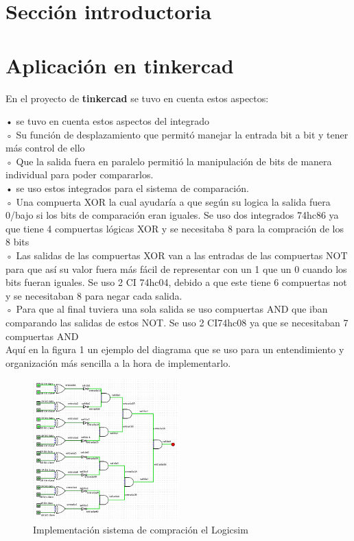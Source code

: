 \documentclass{article}
\begin{document}
\section{Sección introductoria}\label{investigación}


\section{Aplicación en tinkercad}\label{practica}
En el proyecto de  \textbf{tinkercad } \cite{implementacion} se tuvo en cuenta estos aspectos:
\begin{flushleft}
    • se tuvo en cuenta estos aspectos del integrado\\[0.1cm]
        
        ◦ Su función de desplazamiento que permitó manejar la entrada bit a bit y tener más control de ello \\[0.1cm]
        ◦ Que la salida fuera en paralelo permitió la manipulación de bits de manera individual para poder compararlos. \\[0.1cm]
        
    • se uso estos integrados para el sistema de comparación.\\[0.1cm]
        ◦ Una compuerta XOR  la cual ayudaría a que según su logica la salida fuera 0/bajo si los bits de comparación eran iguales. Se uso dos integrados 74hc86 ya que tiene 4 compuertas lógicas XOR y se necesitaba 8 para la compración de los 8 bits\\[0.1cm]
        ◦ Las salidas de las compuertas XOR van a las entradas de las compuertas NOT para que así su valor fuera más fácil de representar con un 1 que un 0 cuando los bits fueran iguales. Se uso 2 CI 74hc04, debido a que este tiene 6 compuertas not y se necesitaban 8 para negar cada salida.\\[0.1cm]
         ◦ Para que al final tuviera una sola salida se uso compuertas AND que iban comparando las salidas de estos NOT. Se uso 2 CI74hc08 ya que se necesitaban 7 compuertas AND\\[0.1cm]
    Aquí en la figura 1 un ejemplo del diagrama que se uso para un entendimiento y organización más sencilla a la hora de implementarlo.
    
    \begin{figure}[!ht]
    \caption{Implementación sistema de compración el Logicsim}
    \centering
    \includegraphics[width=0.5\textwidth]{sistema_compracion_pines.png}
    \end{figure}
    

\end{flushleft}
\end{document}

